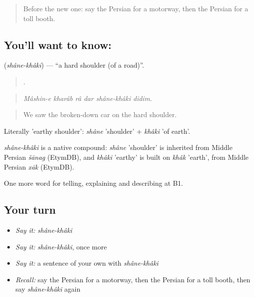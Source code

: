 \label{lesson:FA-C425-shane-khaki}



\begin{quote}
Before the new one: say the Persian for a motorway, then the Persian for a toll booth.
\end{quote}

\subsection*{You'll want to know:  }
\textbf{ } (\emph{shâne-khâki}) — \textquotedblleft{}a hard shoulder (of a road)\textquotedblright{}.

\begin{quote}
      .
\end{quote}

\begin{quote}
\emph{Mâshin-e kharâb râ dar shâne-khâki didim.}
\end{quote}

\begin{quote}
We saw the broken-down car on the hard shoulder.
\end{quote}

Literally 'earthy shoulder': \emph{shâne} 'shoulder' + \emph{khâki} 'of earth'.

\begin{cousinweb}
\emph{shâne-khâki} is a native compound: \emph{shâne} 'shoulder' is inherited from Middle Persian \emph{šānag} (EtymDB), and \emph{khâki} 'earthy' is built on \emph{khâk} 'earth', from Middle Persian \emph{xāk} (EtymDB).
\end{cousinweb}

\begin{grammarlens}[title={What you've built}]
One more word for telling, explaining and describing at B1.
\end{grammarlens}

\subsection*{Your turn}
\begin{itemize}
\raggedright
  \item \emph{Say it:} \emph{shâne-khâki}
  \item \emph{Say it:} \emph{shâne-khâki}, once more
  \item \emph{Say it:} a sentence of your own with \emph{shâne-khâki}
  \item \emph{Recall:} say the Persian for a motorway, then the Persian for a toll booth, then say \emph{shâne-khâki} again
\end{itemize}

